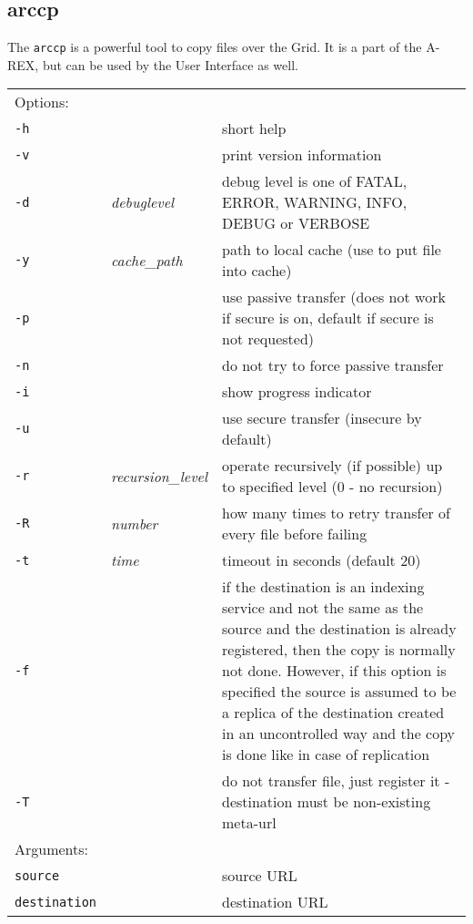 \subsection{arccp}\label{sec:arccp}

The \texttt{arccp}  is a powerful
tool to copy files over the Grid. It is a part of the A-REX,
but can be used by the User Interface as well.
\hspace*{0.5cm}
\begin{shaded}
\end{shaded}
\begin{longtable}{llp{8cm}}
    Options:&&\\
    \texttt{-h} && short help\\
    \texttt{-v} && print version information\\
    \texttt{-d} & \textit{debuglevel} &debug level is one of  FATAL, ERROR, WARNING, INFO, DEBUG or VERBOSE\\
    \texttt{-y} & \textit{cache\_path} & path to local cache (use to put file into cache)\\
    \texttt{-p} && use passive transfer (does not work if secure is on, default if secure is not requested)\\
    \texttt{-n} && do not try to force passive transfer\\
    \texttt{-i} && show progress indicator\\
    \texttt{-u} && use secure transfer (insecure by default)\\
    \texttt{-r} & \textit{recursion\_level} & operate recursively (if possible) up to specified level (0 - no recursion)\\
    \texttt{-R} & \textit{number} & how many times to retry transfer of every file before failing\\
    \texttt{-t} & \textit{time} & timeout in seconds (default 20)\\
    \texttt{-f} && if the destination is an indexing service and not the same as the source and the destination is already registered, then the copy is normally not done. However, if this option is specified the source is assumed to be a replica of the destination created in an uncontrolled way and the copy is done like in case of replication\\
    \texttt{-T} && do not transfer file, just register it - destination must be non-existing meta-url\\
    Arguments:&&\\
    \texttt{source} && source URL\\
    \texttt{destination} && destination URL\\
\end{longtable}

